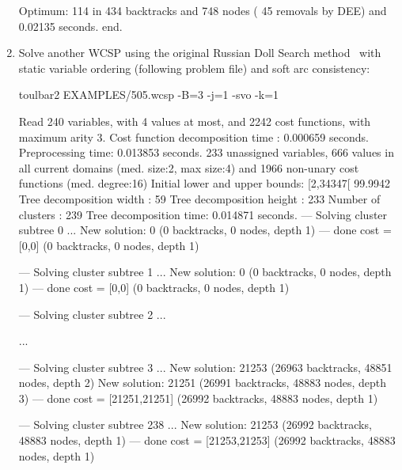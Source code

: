 \begin{enumerate}
{\begin{DoxyCode}
Optimum: 114 in 434 backtracks and 748 nodes ( 45 removals by DEE) and 0.02135 seconds.
end.
\end{DoxyCode}}
\item Solve another WCSP using the original Russian Doll Search method~\cite{Verfaillie96} with static variable
ordering (following problem file) and soft arc consistency:
\begin{DoxyCode}
	toulbar2 EXAMPLES/505.wcsp -B=3 -j=1 -svo -k=1
\end{DoxyCode}
{\scriptsize
\begin{DoxyCode}
Read 240 variables, with 4 values at most, and 2242 cost functions, with maximum arity 3.
Cost function decomposition time : 0.000659 seconds.
Preprocessing time: 0.013853 seconds.
233 unassigned variables, 666 values in all current domains (med. size:2, max size:4) and 1966 non-unary cost functions (med. degree:16)
Initial lower and upper bounds: [2,34347[ 99.9942%
Tree decomposition width  : 59
Tree decomposition height : 233
Number of clusters        : 239
Tree decomposition time: 0.014871 seconds.
--- Solving cluster subtree 0 ...
New solution: 0 (0 backtracks, 0 nodes, depth 1)
---  done  cost = [0,0] (0 backtracks, 0 nodes, depth 1)

--- Solving cluster subtree 1 ...
New solution: 0 (0 backtracks, 0 nodes, depth 1)
---  done  cost = [0,0] (0 backtracks, 0 nodes, depth 1)

--- Solving cluster subtree 2 ...

...

--- Solving cluster subtree 3 ...
New solution: 21253 (26963 backtracks, 48851 nodes, depth 2)
New solution: 21251 (26991 backtracks, 48883 nodes, depth 3)
---  done  cost = [21251,21251] (26992 backtracks, 48883 nodes, depth 1)

--- Solving cluster subtree 238 ...
New solution: 21253 (26992 backtracks, 48883 nodes, depth 1)
---  done  cost = [21253,21253] (26992 backtracks, 48883 nodes, depth 1)


\end{DoxyCode}}
\end{enumerate}
